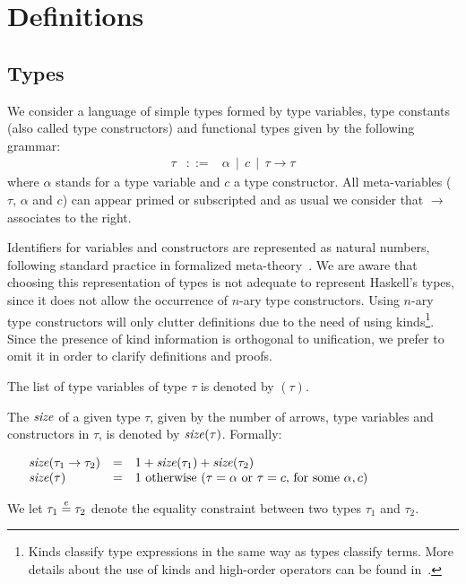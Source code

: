  \section{Definitions}\label{definitions}

\subsection{Types}\label{types}

We consider a language of simple types formed by type variables, type
constants (also called type constructors) and functional types given
by the following grammar:
\[
\begin{array}{rcl}
  \tau & ::= & \alpha\,\mid\,c\,\mid\,\tau\to\tau
\end{array}
\]
where $\alpha$ stands for a type variable and $c$ a type
constructor. All meta-variables ($\tau,\,\alpha$ and $c$) can appear
primed or subscripted and as usual we consider that $\to$ associates
to the right. 

Identifiers for variables and constructors are represented as natural
numbers, following standard practice in formalized
meta-theory~. We are aware that choosing
this representation of types is not adequate to represent Haskell's
types, since it does not allow the occurrence of $n$-ary type
constructors. Using $n$-ary type constructors will only clutter
definitions due to the need of using kinds\footnote{Kinds classify
  type expressions in the same way as types classify terms. More
  details about the use of kinds and high-order operators can be found
  in~\cite{Pierce02}.}. Since the presence of kind information is
orthogonal to unification, we prefer to omit it in order to clarify
definitions and proofs.

The list of type variables of type $\tau$ is denoted by \fv$(\tau)$.

The $\text{\it size\/}$ of a given type $\tau$, given by the number of arrows,
type variables and constructors in $\tau$, is denoted by
$\text{\it size\/}(\tau)$. Formally:

\[ \begin{array}[t]{llp{.7\textwidth}} 
     \size(\tau_1 \to \tau_2) & = & $1 + \size(\tau_1) + \size(\tau_2)$ \\
     \size(\tau)              & = & $1$ otherwise ($\tau=\alpha$ or $\tau=c$, 
                                        for some $\alpha, c$)
   \end{array}
\]

We let $\tau_1 \overset{e}{=} \tau_2$ denote the equality constraint between two
types $\tau_1$ and $\tau_2$.

